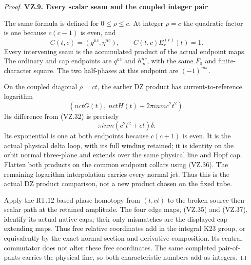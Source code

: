 \begin{proof}
\par

\medskip\noindent\textbf{VZ.9. Every scalar seam and the coupled integer pair}

\par\nobreak

The same formula is defined for \(0\le\rho\le c\). At integer \(\rho=c\)
the quadratic factor is one because \(c(c-1)\) is even, and
\[
 C(t,c)=(g^{nc},\eta^{nc}),\qquad C(t,c)E_r^{(c)}(t)=1.
                                                               \tag{VZ.36}
\]
Every intervening seam is the accumulated product of the actual
endpoint maps. The ordinary and cap endpoints are \(q^{nc}\) and
\(h_\infty^{nc}\), with the same \(F_0\) and finite-character square.
The two half-phases at this endpoint are \((-1)^{nbc}\).

On the coupled diagonal \(\rho=ct\), the earlier DZ product has
current-to-reference logarithm
\[
 (nctG(t),\ nctH(t)+2\pi inm c^2t^2).
\]
Its difference from (VZ.32) is precisely
\[
                  \pi inm(c^2t^2+ct)\delta.          \tag{VZ.37}
\]
Its exponential is one at both endpoints because \(c(c+1)\) is even.
It is the actual physical delta loop, with its full winding retained;
it is identity on the orbit normal three-plane and extends over the
same physical line and Hopf cap. Flatten both products on the common
endpoint collars using (VZ.36). The remaining logarithm interpolation
carries every normal jet. Thus this is the actual DZ product comparison,
not a new product chosen on the fixed tube.

Apply the RT.12 based phase homotopy from \((t,ct)\) to the broken
source-then-scalar path at the retained amplitude. The four edge maps,
(VZ.35) and (VZ.37), identify its actual native caps; their only
mismatches are the displayed cap-extending maps. Thus free relative
coordinates add in the integral K23 group, or equivalently by the
exact normal-section and derivative composition. Its central
commutator does not alter these free coordinates. The same completed
pair-of-pants carries the physical line, so both characteristic
numbers add as integers.


\end{proof}
